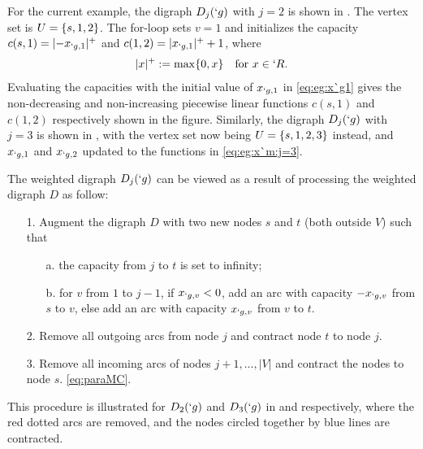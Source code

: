 \documentclass[conference,letterpaper]{IEEEtran}
\begin{document}
For the current example, the digraph $D_j(`g)$ with $j=2$ is shown in . The vertex set is $U=\{s,1,2\}$.
The for-loop sets $v=1$ and initializes the capacity $c(s,1)=\lvert-x_{`g,1}\rvert^+$ and $c(1,2)=\lvert x_{`g,1}\rvert^++1$, where
\begin{align}
	\lvert x\rvert^+ :=\max \{0,x\}\kern1em \text {for $x\in `R$}.
\end{align}
Evaluating the capacities with the initial value of $x_{`g,1}$ in \eqref{eq:eg:x`g1} gives the non-decreasing and non-increasing piecewise linear functions $c(s,1)$ and $c(1,2)$ respectively shown in the figure. Similarly, the digraph $D_j(`g)$ with $j=3$ is shown in , with the vertex set now being $U=\{s,1,2,3\}$ instead, and $x_{`g,1}$ and $x_{`g,2}$ updated to the functions in \eqref{eq:eg:x`m:j=3}.

The weighted digraph $D_j(`g)$ can be viewed as a result of processing the weighted digraph $D$ as follow:
\begin{itemize}
	\item[1.] Augment the digraph $D$ with two new nodes $s$ and $t$ (both outside $V$) such that
	\begin{itemize}
		\item[a.] the capacity from $j$ to $t$ is set to infinity;
		\item[b.] for $v$ from $1$ to $j-1$, if $x_{`g,v}<0$, add an arc with capacity $-x_{`g,v}$
		from $s$ to $v$, else add an arc with capacity  $x_{`g,v}$ from $v$ to $t$.
	\end{itemize}
	\item[2.] Remove all outgoing arcs from node $j$ and contract node $t$ to node $j$.
	\item[3.] Remove all incoming arcs of nodes $j+1,...,|V|$ and contract the nodes to node $s$.
	\eqref{eq:paraMC}.
\end{itemize}
This procedure is illustrated for $D_2(`g)$ and $D_3(`g)$ in  and  respectively, where the red dotted arcs are removed, and the nodes circled together by blue lines are contracted.
\end{document}
